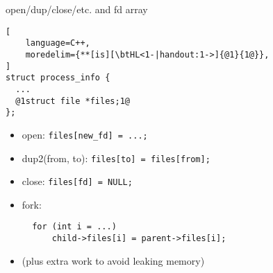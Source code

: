 \begin{frame}[fragile,label=openCloseAndFdArray]{open/dup/close/etc. and fd array}
\begin{lstlisting}[
    language=C++,
    moredelim={**[is][\btHL<1-|handout:1->]{@1}{1@}},
]
struct process_info {
  ...
  @1struct file *files;1@  
};
\end{lstlisting}
\begin{itemize}
\item open: \lstinline|files[new_fd] = ...;|
\item dup2(from, to): \lstinline|files[to] = files[from];|
\item close: \lstinline|files[fd] = NULL;|
\item fork: 
\begin{lstlisting}
  for (int i = ...)
      child->files[i] = parent->files[i];
\end{lstlisting}
\vspace{.25cm}
\item (plus extra work to avoid leaking memory)
\end{itemize}
\end{frame}
